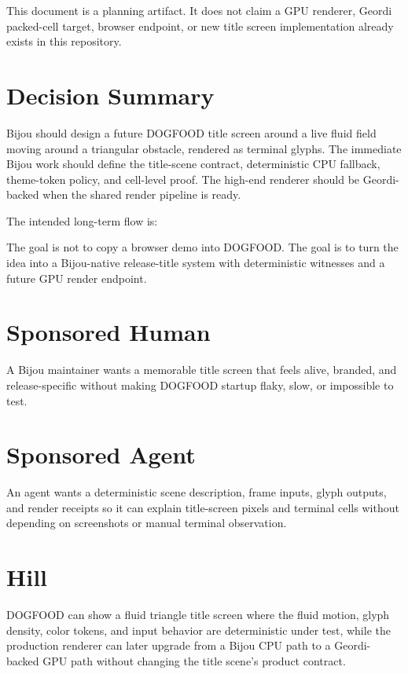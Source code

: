 This document is a planning artifact. It does not claim a GPU renderer, Geordi packed-cell target, browser endpoint, or new title screen implementation already exists in this repository.

\section{Decision Summary}\label{record-114-decision-summary}

Bijou should design a future DOGFOOD title screen around a live fluid field moving around a triangular obstacle, rendered as terminal glyphs. The immediate Bijou work should define the title-scene contract, deterministic CPU fallback, theme-token policy, and cell-level proof. The high-end renderer should be Geordi-backed when the shared render pipeline is ready.

The intended long-term flow is:



The goal is not to copy a browser demo into DOGFOOD. The goal is to turn the idea into a Bijou-native release-title system with deterministic witnesses and a future GPU render endpoint.

\section{Sponsored Human}\label{record-114-sponsored-human}

A Bijou maintainer wants a memorable title screen that feels alive, branded, and release-specific without making DOGFOOD startup flaky, slow, or impossible to test.

\section{Sponsored Agent}\label{record-114-sponsored-agent}

An agent wants a deterministic scene description, frame inputs, glyph outputs, and render receipts so it can explain title-screen pixels and terminal cells without depending on screenshots or manual terminal observation.

\section{Hill}\label{record-114-hill}

DOGFOOD can show a fluid triangle title screen where the fluid motion, glyph density, color tokens, and input behavior are deterministic under test, while the production renderer can later upgrade from a Bijou CPU path to a Geordi-backed GPU path without changing the title scene's product contract.

